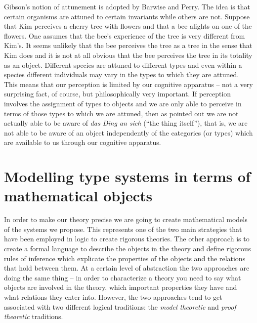 Gibson's notion of attunement is adopted by Barwise and Perry.  The
idea is that certain organisms are attuned to certain invariants while
others are not.  Suppose that Kim perceives a cherry tree with flowers
and that a bee alights on one of the flowers.  One assumes that the bee's
experience of the tree is very different from Kim's.  It seems
unlikely that the bee perceives the tree as a tree in the sense that
Kim does and it is not at all obvious that the bee perceives the tree
in its totality as an object.  Different species are attuned to
different types and even within a species different individuals
may vary in the types to which they are attuned.  This means that our
perception is limited by our cognitive apparatus -- not a very
surprising fact, of course, but philosophically very important.  If
perception involves the assignment of types to objects and we are only
able to perceive in terms of those types to which we are attuned, then
as \cite{Kant1781} pointed out we are not actually able to be aware of
\textit{das Ding an sich} (``the thing itself''), that is, we are not
able to be aware of an object independently of the categories (or
types) which are available to us through our cognitive apparatus.
  

\section{Modelling type systems in terms of mathematical objects}

In order to make our theory precise we are going to create
mathematical models of the systems we propose.  This
represents one  of the two main strategies that have been employed in
logic to create rigorous theories.  The other approach is to create a
formal language to describe the objects in the theory and define
rigorous rules of inference which explicate the properties of the
objects and the relations that hold between them.  At a certain level
of abstraction the two approaches are doing the same thing -- in order
to characterize a theory you need to say what objects are involved in
the theory, which important properties they have and what relations
they enter into.  However, the two approaches tend to get associated
with two different logical traditions: the \textit{model theoretic}
and \textit{proof theoretic} traditions.  

